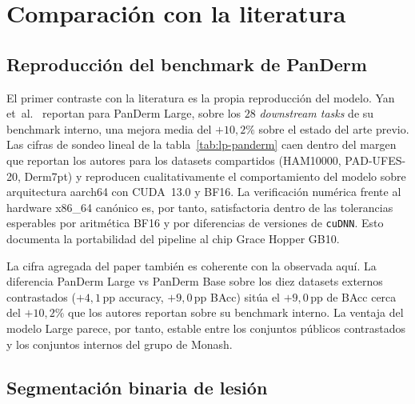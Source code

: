 \section{Comparación con la literatura}
\label{sec:lit}

\subsection{Reproducción del benchmark de PanDerm}
\label{sec:lit-panderm}

El primer contraste con la literatura es la propia reproducción del
modelo. Yan et~al.~\cite{panderm2025} reportan para PanDerm Large,
sobre los $28$ \emph{downstream tasks} de su benchmark interno,
una mejora media del $+10{,}2\%$ sobre el estado del arte previo.
Las cifras de sondeo lineal de la tabla~\ref{tab:lp-panderm} caen
dentro del margen que reportan los autores para los datasets
compartidos (HAM10000, PAD-UFES-20, Derm7pt) y reproducen
cualitativamente el comportamiento del modelo sobre arquitectura
aarch64 con CUDA~13.0 y BF16. La verificación numérica frente al
hardware x86\_64 canónico es, por tanto, satisfactoria dentro de
las tolerancias esperables por aritmética BF16 y por diferencias de
versiones de \texttt{cuDNN}. Esto documenta la portabilidad del
pipeline al chip Grace Hopper GB10.

La cifra agregada del paper también es coherente con la observada
aquí. La diferencia PanDerm Large vs PanDerm Base sobre los diez
datasets externos contrastados ($+4{,}1$\,pp accuracy,
$+9{,}0$\,pp BAcc) sitúa el $+9{,}0$\,pp de BAcc cerca del
$+10{,}2\%$ que los autores reportan sobre su benchmark interno.
La ventaja del modelo Large parece, por tanto, estable entre los
conjuntos públicos contrastados y los conjuntos internos del grupo
de Monash.

\subsection{Segmentación binaria de lesión}
\label{sec:lit-seg}

